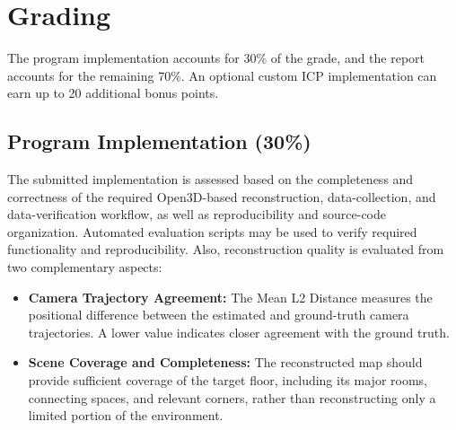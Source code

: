 \documentclass[11pt]{article}
\newcommand{\code}[1]{\texttt{\detokenize{#1}}}
\begin{document}


\section{Grading}
The program implementation accounts for 30\% of the grade, and the report accounts for the remaining 70\%. An optional custom ICP implementation can earn up to 20 additional bonus points.

\subsection{Program Implementation (30\%)}

The submitted implementation is assessed based on the completeness and correctness of the required Open3D-based reconstruction, data-collection, and data-verification workflow, as well as reproducibility and source-code organization. Automated evaluation scripts may be used to verify required functionality and reproducibility. Also, reconstruction quality is evaluated from two complementary aspects:
\begin{itemize}
    \item \textbf{Camera Trajectory Agreement: }
    The Mean L2 Distance measures the positional difference between the estimated and ground-truth camera trajectories. A lower value indicates closer agreement with the ground truth.

    \item \textbf{Scene Coverage and Completeness: }
    The reconstructed map should provide sufficient coverage of the target floor,
    including its major rooms, connecting spaces, and relevant corners, rather
    than reconstructing only a limited portion of the environment.
\end{itemize}
\end{document}
